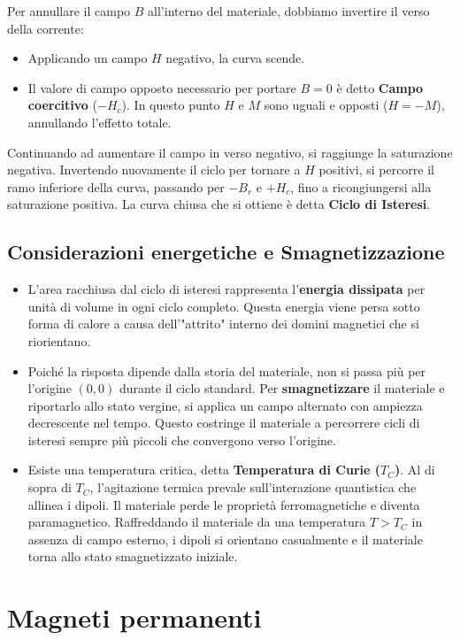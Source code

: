 \documentclass{book}
\begin{document}
Per annullare il campo $B$ all'interno del materiale, dobbiamo invertire il verso della corrente:
\begin{itemize}
    \item Applicando un campo $H$ negativo, la curva scende.
    \item Il valore di campo opposto necessario per portare $B=0$ è detto \textbf{Campo coercitivo} ($-H_c$). In questo punto $H$ e $M$ sono uguali e opposti ($H = -M$), annullando l'effetto totale.
\end{itemize}

Continuando ad aumentare il campo in verso negativo, si raggiunge la saturazione negativa. Invertendo nuovamente il ciclo per tornare a $H$ positivi, si percorre il ramo inferiore della curva, passando per $-B_r$ e $+H_c$, fino a ricongiungersi alla saturazione positiva.
La curva chiusa che si ottiene è detta \textbf{Ciclo di Isteresi}.

\subsection{Considerazioni energetiche e Smagnetizzazione}
\begin{itemize}
    \item L'area racchiusa dal ciclo di isteresi rappresenta l'\textbf{energia dissipata} per unità di volume in ogni ciclo completo. Questa energia viene persa sotto forma di calore a causa dell'"attrito" interno dei domini magnetici che si riorientano.
    \item Poiché la risposta dipende dalla storia del materiale, non si passa più per l'origine $(0,0)$ durante il ciclo standard. Per \textbf{smagnetizzare} il materiale e riportarlo allo stato vergine, si applica un campo alternato con ampiezza decrescente nel tempo. Questo costringe il materiale a percorrere cicli di isteresi sempre più piccoli che convergono verso l'origine.
    \item Esiste una temperatura critica, detta \textbf{Temperatura di Curie ($T_C$)}. Al di sopra di $T_C$, l'agitazione termica prevale sull'interazione quantistica che allinea i dipoli. Il materiale perde le proprietà ferromagnetiche e diventa paramagnetico. Raffreddando il materiale da una temperatura $T > T_C$ in assenza di campo esterno, i dipoli si orientano casualmente e il materiale torna allo stato smagnetizzato iniziale.
\end{itemize}


\section{Magneti permanenti}
\end{document}

